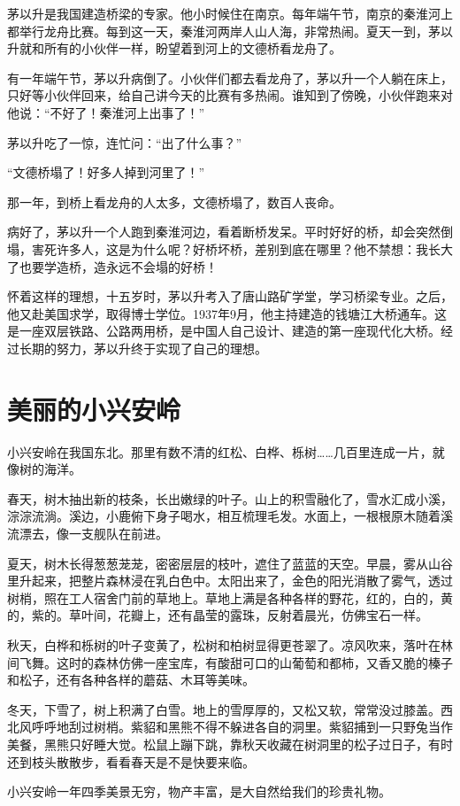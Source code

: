 \documentclass[12pt,UTF-8,openany]{ctexbook}
\begin{document}
\begin{large}
    
    茅以升是我国建造桥梁的专家。他小时候住在南京。每年端午节，南京的秦淮河上都举行龙舟比赛。每到这一天，秦淮河两岸人山人海，非常热闹。夏天一到，茅以升就和所有的小伙伴一样，盼望着到河上的文德桥看龙舟了。
    
    有一年端午节，茅以升病倒了。小伙伴们都去看龙舟了，茅以升一个人躺在床上，只好等小伙伴回来，给自己讲今天的比赛有多热闹。谁知到了傍晚，小伙伴跑来对他说：“不好了！秦淮河上出事了！”
    
    茅以升吃了一惊，连忙问：“出了什么事？”
    
    “文德桥塌了！好多人掉到河里了！”
    
    那一年，到桥上看龙舟的人太多，文德桥塌了，数百人丧命。
    
    病好了，茅以升一个人跑到秦淮河边，看着断桥发呆。平时好好的桥，却会突然倒塌，害死许多人，这是为什么呢？好桥坏桥，差别到底在哪里？他不禁想：我长大了也要学造桥，造永远不会塌的好桥！
    
    怀着这样的理想，十五岁时，茅以升考入了唐山路矿学堂，学习桥梁专业。之后，他又赴美国求学，取得博士学位。1937年9月，他主持建造的钱塘江大桥通车。这是一座双层铁路、公路两用桥，是中国人自己设计、建造的第一座现代化大桥。经过长期的努力，茅以升终于实现了自己的理想。
    
\end{large}



\chapter{美丽的小兴安岭}

\begin{large}
    
    小兴安岭在我国东北。那里有数不清的红松、白桦、栎树……几百里连成一片，就像树的海洋。
    
    春天，树木抽出新的枝条，长出嫩绿的叶子。山上的积雪融化了，雪水汇成小溪，淙淙流淌。溪边，小鹿俯下身子喝水，相互梳理毛发。水面上，一根根原木随着溪流漂去，像一支舰队在前进。
    
    夏天，树木长得葱葱茏茏，密密层层的枝叶，遮住了蓝蓝的天空。早晨，雾从山谷里升起来，把整片森林浸在乳白色中。太阳出来了，金色的阳光消散了雾气，透过树梢，照在工人宿舍门前的草地上。草地上满是各种各样的野花，红的，白的，黄的，紫的。草叶间，花瓣上，还有晶莹的露珠，反射着晨光，仿佛宝石一样。
    
    秋天，白桦和栎树的叶子变黄了，松树和柏树显得更苍翠了。凉风吹来，落叶在林间飞舞。这时的森林仿佛一座宝库，有酸甜可口的山葡萄和都柿，又香又脆的榛子和松子，还有各种各样的蘑菇、木耳等美味。
    
    冬天，下雪了，树上积满了白雪。地上的雪厚厚的，又松又软，常常没过膝盖。西北风呼呼地刮过树梢。紫貂和黑熊不得不躲进各自的洞里。紫貂捕到一只野兔当作美餐，黑熊只好睡大觉。松鼠上蹦下跳，靠秋天收藏在树洞里的松子过日子，有时还到枝头散散步，看看春天是不是快要来临。
    
    小兴安岭一年四季美景无穷，物产丰富，是大自然给我们的珍贵礼物。
    
\end{large}
\end{document}
